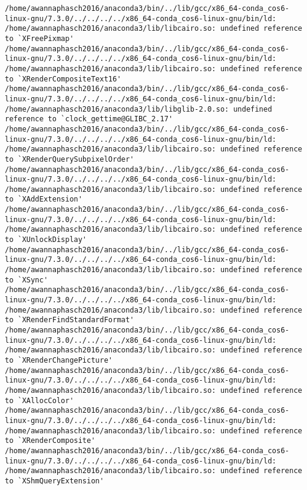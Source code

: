 \documentclass[11pt]{article}
\begin{document}
\begin{enumerate}
\begin{enumerate}
\begin{verbatim}
/home/awannaphasch2016/anaconda3/bin/../lib/gcc/x86_64-conda_cos6-linux-gnu/7.3.0/../../../../x86_64-conda_cos6-linux-gnu/bin/ld: /home/awannaphasch2016/anaconda3/lib/libcairo.so: undefined reference to `XFreePixmap'
/home/awannaphasch2016/anaconda3/bin/../lib/gcc/x86_64-conda_cos6-linux-gnu/7.3.0/../../../../x86_64-conda_cos6-linux-gnu/bin/ld: /home/awannaphasch2016/anaconda3/lib/libcairo.so: undefined reference to `XRenderCompositeText16'
/home/awannaphasch2016/anaconda3/bin/../lib/gcc/x86_64-conda_cos6-linux-gnu/7.3.0/../../../../x86_64-conda_cos6-linux-gnu/bin/ld: /home/awannaphasch2016/anaconda3/lib/libglib-2.0.so: undefined reference to `clock_gettime@GLIBC_2.17'
/home/awannaphasch2016/anaconda3/bin/../lib/gcc/x86_64-conda_cos6-linux-gnu/7.3.0/../../../../x86_64-conda_cos6-linux-gnu/bin/ld: /home/awannaphasch2016/anaconda3/lib/libcairo.so: undefined reference to `XRenderQuerySubpixelOrder'
/home/awannaphasch2016/anaconda3/bin/../lib/gcc/x86_64-conda_cos6-linux-gnu/7.3.0/../../../../x86_64-conda_cos6-linux-gnu/bin/ld: /home/awannaphasch2016/anaconda3/lib/libcairo.so: undefined reference to `XAddExtension'
/home/awannaphasch2016/anaconda3/bin/../lib/gcc/x86_64-conda_cos6-linux-gnu/7.3.0/../../../../x86_64-conda_cos6-linux-gnu/bin/ld: /home/awannaphasch2016/anaconda3/lib/libcairo.so: undefined reference to `XUnlockDisplay'
/home/awannaphasch2016/anaconda3/bin/../lib/gcc/x86_64-conda_cos6-linux-gnu/7.3.0/../../../../x86_64-conda_cos6-linux-gnu/bin/ld: /home/awannaphasch2016/anaconda3/lib/libcairo.so: undefined reference to `XSync'
/home/awannaphasch2016/anaconda3/bin/../lib/gcc/x86_64-conda_cos6-linux-gnu/7.3.0/../../../../x86_64-conda_cos6-linux-gnu/bin/ld: /home/awannaphasch2016/anaconda3/lib/libcairo.so: undefined reference to `XRenderFindStandardFormat'
/home/awannaphasch2016/anaconda3/bin/../lib/gcc/x86_64-conda_cos6-linux-gnu/7.3.0/../../../../x86_64-conda_cos6-linux-gnu/bin/ld: /home/awannaphasch2016/anaconda3/lib/libcairo.so: undefined reference to `XRenderChangePicture'
/home/awannaphasch2016/anaconda3/bin/../lib/gcc/x86_64-conda_cos6-linux-gnu/7.3.0/../../../../x86_64-conda_cos6-linux-gnu/bin/ld: /home/awannaphasch2016/anaconda3/lib/libcairo.so: undefined reference to `XAllocColor'
/home/awannaphasch2016/anaconda3/bin/../lib/gcc/x86_64-conda_cos6-linux-gnu/7.3.0/../../../../x86_64-conda_cos6-linux-gnu/bin/ld: /home/awannaphasch2016/anaconda3/lib/libcairo.so: undefined reference to `XRenderComposite'
/home/awannaphasch2016/anaconda3/bin/../lib/gcc/x86_64-conda_cos6-linux-gnu/7.3.0/../../../../x86_64-conda_cos6-linux-gnu/bin/ld: /home/awannaphasch2016/anaconda3/lib/libcairo.so: undefined reference to `XShmQueryExtension'

\end{verbatim}
\end{enumerate}
\end{enumerate}
\end{document}
